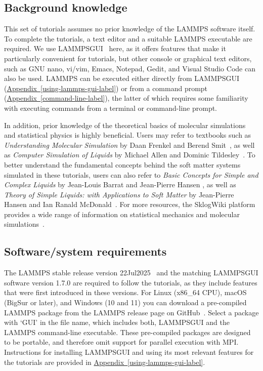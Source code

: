 \documentclass[9pt,tutorial]{livecoms}
\newcommand{\lammpsgui}{\textsf{LAMMPS\textendash GUI}}
\begin{document}
\subsection{Background knowledge}

This set of tutorials assumes no prior knowledge of the LAMMPS software
itself.  To complete the tutorials, a text editor and a suitable LAMMPS
executable are required.  We use \lammpsgui{}~\cite{lammps_gui_docs}
here, as it offers features that make it particularly convenient for
tutorials, but other console or graphical text editors, such as GNU
nano, vi/vim, Emacs, Notepad, Gedit, and Visual Studio Code can also be
used.  LAMMPS can be executed either directly from \lammpsgui{}
(\hyperref[using-lammps-gui-label]{Appendix~\ref{using-lammps-gui-label}})
or from a command prompt
(\hyperref[command-line-label]{Appendix~\ref{command-line-label}}), the
latter of which requires some familiarity with executing commands from a
terminal or command-line prompt.

In addition, prior knowledge of the theoretical basics of molecular
simulations and statistical physics is highly beneficial.  Users may
refer to textbooks such as \textit{Understanding Molecular Simulation} by
Daan Frenkel and Berend Smit~\cite{frenkel2023understanding}, as well as
\textit{Computer Simulation of Liquids} by Michael Allen and Dominic
Tildesley~\cite{allen2017computer}.  To better understand
the fundamental concepts behind the soft matter systems simulated in these
tutorials, users can also refer to \textit{Basic Concepts for Simple and
  Complex Liquids} by Jean-Louis Barrat and Jean-Pierre Hansen
\cite{barrat2003basic}, as well as \textit{Theory of Simple Liquids:
  with Applications to Soft Matter} by Jean-Pierre Hansen and Ian Ranald
McDonald~\cite{hansen2013theory}.  For more resources, the SklogWiki
platform provides a wide range of information on statistical mechanics
and molecular simulations~\cite{sklogwiki_main_page}.

\subsection{Software/system requirements}

The LAMMPS stable release version 22Jul2025~\cite{lammps_code}
and the matching \lammpsgui{} software version 1.7.0 are required to
follow the tutorials, as they include features that were first
introduced in these versions.  For Linux (x86\_64 CPU), macOS (BigSur or
later), and Windows (10 and 11) you can download a pre-compiled LAMMPS
package from the LAMMPS release page on
GitHub~\cite{lammps_github_release}.  Select a package with `GUI' in the
file name, which includes both, \lammpsgui{} and the LAMMPS command-line
executable.  These pre-compiled packages are designed to be portable, and
therefore omit support for parallel execution with MPI.  Instructions
for installing \lammpsgui{} and using its most relevant features for the
tutorials are provided in
\hyperref[using-lammps-gui-label]{Appendix~\ref{using-lammps-gui-label}}.
\end{document}

